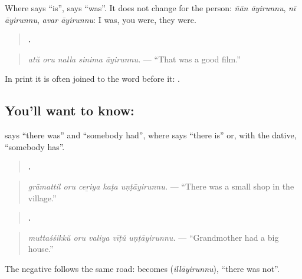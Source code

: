 Where \textbf{} says \textquotedblleft{}is\textquotedblright{}, \textbf{} says \textquotedblleft{}was\textquotedblright{}. It does not change for the person: \emph{ñān āyirunnu}, \emph{nī āyirunnu}, \emph{avar āyirunnu}: I was, you were, they were.

\begin{quote}
\textbf{    .}
\end{quote}

\begin{quote}
\emph{atŭ oru nalla sinima āyirunnu.} — \textquotedblleft{}That was a good film.\textquotedblright{}
\end{quote}

In print it is often joined to the word before it: \textbf{}.

\subsection*{You'll want to know: }
\textbf{} says \textquotedblleft{}there was\textquotedblright{} and \textquotedblleft{}somebody had\textquotedblright{}, where \textbf{} says \textquotedblleft{}there is\textquotedblright{} or, with the dative, \textquotedblleft{}somebody has\textquotedblright{}.

\begin{quote}
\textbf{    .}
\end{quote}

\begin{quote}
\emph{grāmattil oru ceṟiya kaṭa uṇṭāyirunnu.} — \textquotedblleft{}There was a small shop in the village.\textquotedblright{}
\end{quote}

\begin{quote}
\textbf{    .}
\end{quote}

\begin{quote}
\emph{muttaśśikkŭ oru valiya vīṭŭ uṇṭāyirunnu.} — \textquotedblleft{}Grandmother had a big house.\textquotedblright{}
\end{quote}

The negative follows the same road: \textbf{} becomes \textbf{} (\emph{illāyirunnu}), \textquotedblleft{}there was not\textquotedblright{}.

